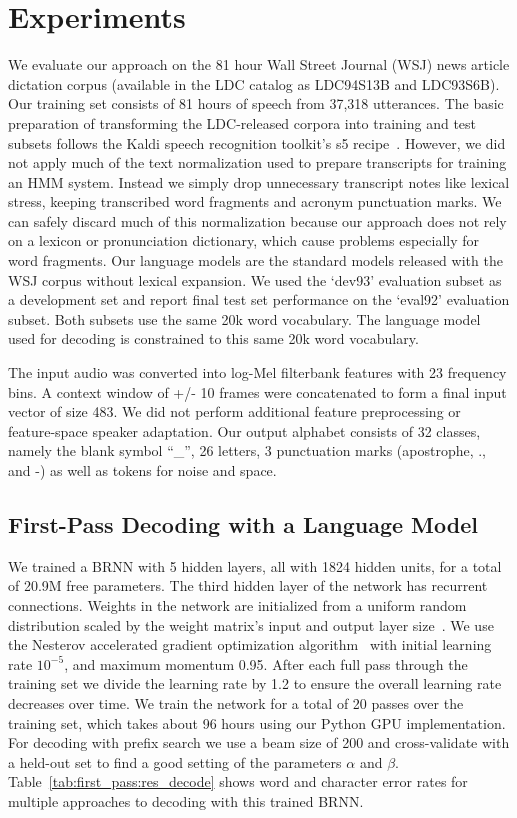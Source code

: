 \section{Experiments}

We evaluate our approach on the 81 hour Wall Street Journal (WSJ) news article
dictation corpus (available in the LDC catalog as LDC94S13B and LDC93S6B). Our
training set consists of 81 hours of speech from 37,318 utterances. The basic
preparation of transforming the LDC-released corpora into training and test
subsets follows the Kaldi speech recognition toolkit's s5
recipe~\cite{povey2011}. However, we did not apply much of the text
normalization used to prepare transcripts for training an HMM system. Instead
we simply drop unnecessary transcript notes like lexical stress, keeping
transcribed word fragments and acronym punctuation marks. We can safely discard
much of this normalization because our approach does not rely on a lexicon or
pronunciation dictionary, which cause problems especially for word fragments.
Our language models are the standard models released with the WSJ corpus
without lexical expansion. We used the `dev93' evaluation subset as a
development set and report final test set performance on the `eval92'
evaluation subset. Both subsets use the same 20k word vocabulary. The language
model used for decoding is constrained to this same 20k word vocabulary.

The input audio was converted into log-Mel filterbank features with 23
frequency bins. A context window of +/- 10 frames were concatenated to form a
final input vector of size 483. We did not perform additional feature
preprocessing or feature-space speaker adaptation.  Our output alphabet
consists of 32 classes, namely the blank symbol ``\_'', 26 letters, 3
punctuation marks (apostrophe, ., and -) as well as tokens for noise and space. 

\subsection{First-Pass Decoding with a Language Model}

We trained a BRNN with 5 hidden layers, all with 1824 hidden units, for a
total of 20.9M free parameters. The third hidden layer of the network has
recurrent connections. Weights in the network are initialized from a uniform
random distribution scaled by the weight matrix's input and output layer
size~\cite{glorot2011}. We use the Nesterov accelerated gradient optimization
algorithm~\cite{sutskever2013} with initial learning rate $10^{-5}$, and
maximum momentum 0.95. After each full pass through the training set we divide
the learning rate by 1.2 to ensure the overall learning rate decreases over
time. We train the network for a total of 20 passes over the training set,
which takes about 96 hours using our Python GPU implementation. For decoding
with prefix search we use a beam size of 200 and cross-validate with a held-out
set to find a good setting of the parameters $\alpha$ and $\beta$.
Table~\ref{tab:first_pass:res_decode} shows word and character error rates for
multiple approaches to decoding with this trained BRNN.

